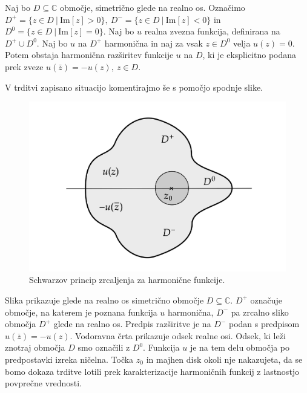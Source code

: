\documentclass[mat1, tisk]{fmfdelo}
\begin{document}
    \begin{izrek}
        \label{schwarz_harm}
        Naj bo $D \subseteq \mathbb{C}$ območje, simetrično glede na realno os. 
        Označimo $D^{+} = \{z \in D~|~\text{Im}[z] > 0\},~D^{-} = \{z \in D~|~\text{Im}[z] < 0\}$ in $D^{0} = \{z \in D~|~\text{Im}[z] = 0\}$.
        Naj bo $u$ realna zvezna funkcija, definirana na $D^{+} \cup D^0$. Naj bo $u$ na $D^{+}$ harmonična in naj za vsak $z \in D^0$ velja $u(z) = 0$.
        Potem obstaja harmonična razširitev funkcije $u$ na $D$, ki je eksplicitno podana prek zveze $u(\bar{z}) = - u(z),~z \in D$.
    \end{izrek}

    V trditvi zapisano situacijo komentirajmo še s pomočjo spodnje slike. 
    \begin{figure}[H]
        \begin{center}
            \includegraphics[width = \textwidth]{schwarz_harm.png}
            \caption{Schwarzov princip zrcaljenja za harmonične funkcije.}
        \end{center}    
    \end{figure}

    Slika prikazuje glede na realno os simetrično območje $D \subseteq \mathbb{C}$. $D^{+}$ označuje območje, na katerem je poznana funkcija $u$ harmonična, $D^{-}$ pa zrcalno sliko območja $D^+$ glede na realno os. 
    Predpis razširitve je na $D^-$ podan s predpisom \mbox{$u(\overline{z}) = - u(z)$}.
    Vodoravna črta prikazuje odsek realne osi. Odsek, ki leži znotraj območja $D$ smo označili z $D^0$. Funkcija $u$ je na tem delu območja po predpostavki izreka ničelna.
    Točka $z_0$ in majhen disk okoli nje nakazujeta, da se bomo dokaza trditve lotili prek karakterizacije harmoničnih funkcij z lastnostjo povprečne vrednosti.
\end{document}
